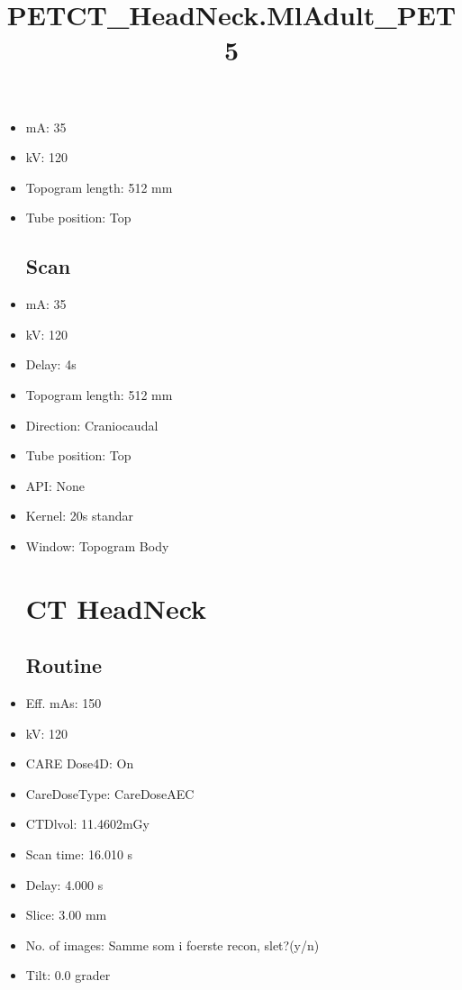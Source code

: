 \documentclass[12pt]{article}
\title{PETCT\_HeadNeck.MlAdult\_PET5}
\begin{document}
\maketitle
\newpage
\tableofcontents
\newpage
{}


\begin{itemize}\section{Topogram}
\subsection{Routine}
\item mA: 35\item kV: 120\item Topogram length: 512 mm\item Tube position: Top
\subsection{Scan}\item mA: 35\item kV: 120\item Delay: 4s\item Topogram length: 512 mm\item Direction: Craniocaudal\item Tube position: Top\item API: None\item Kernel: 20s standar\item Window: Topogram Body
\section{CT HeadNeck}
\subsection{Routine}
\item Eff. mAs: 150\item kV: 120\item CARE Dose4D: On\item CareDoseType: CareDoseAEC\item CTDlvol: 11.4602mGy\item Scan time: 16.010 s\item Delay: 4.000 s\item Slice: 3.00 mm\item No. of images: Samme som i foerste recon, slet?(y/n)\item Tilt: 0.0 grader

\end{itemize}
\end{document}
